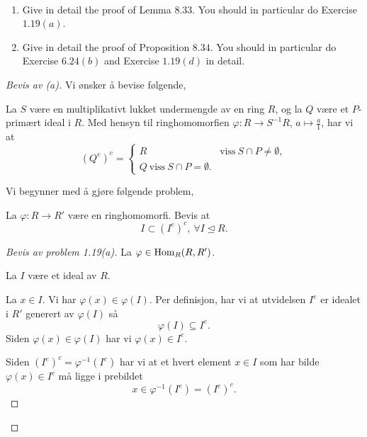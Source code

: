 \documentclass[11pt]{article}
\begin{document}
\begin{prob*}[2]
    \medskip 
    \
    
    \begin{enumerate}[label=(\alph*)]
        \item Give in detail the proof of Lemma $8.33$. 
            You should in particular do Exercise 
            $1.19(a)$. 
        \item Give in detail the proof of 
            Proposition $8.34$. You should in particular 
            do Exercise $6.24(b)$ and Exercise 
            $1.19(d)$ in detail. 
    \end{enumerate}
\end{prob*}
\begin{proof}[Bevis av (a)]
    Vi ønsker å bevise følgende, 
    \begin{lem*}
        La $S$ være en multiplikativt lukket 
        undermengde av en ring $R$, og la 
        $Q$ være et $P$-primært ideal i $R$. 
        Med hensyn til ringhomomorfien 
        $\varphi : R \to S^{-1}R$, $a \mapsto \frac{a}1$, 
        har vi at 
        \[
            (Q^e)^c = 
            \begin{cases}
                R & \text{viss} \ S \cap P \neq \emptyset, \\ 
                Q \ \text{viss} \ S \cap P = \emptyset.
            \end{cases}
        \]
    \end{lem*}

    Vi begynner med å gjøre følgende problem,
    \begin{prob*}
        La $\varphi : R \to R'$ være en 
        ringhomomorfi. Bevis at 
        \[
            I \subset (I^e)^c, \ \forall I \trianglelefteq R.
        \]
    \end{prob*}

    \begin{proof}[Bevis av problem 1.19(a)]
        La $\varphi \in \operatorname{Hom}_R(R,R')$. 
        
        La $I$ være et ideal av $R$. 

        La $x \in I$. 
        Vi har $\varphi(x) \in \varphi(I)$. 
        Per definisjon, har vi at 
        utvidelsen $I^e$ er idealet i $R'$ generert 
        av $\varphi(I)$ så 
        \[
            \varphi(I) \subseteq I^e. 
        \]
        Siden $\varphi(x) \in \varphi(I)$ har vi 
        $\varphi(x) \in I^e$. 

        Siden $(I^e)^c = \varphi^{-1}(I^e)$ har vi 
        at et hvert element $x \in I$ som har 
        bilde $\varphi(x) \in I^c$ må 
        ligge i prebildet 
        \[
            x \in \varphi^{-1}(I^e) = (I^e)^c.
        \]
    \end{proof} 


\end{proof}
\end{document}
